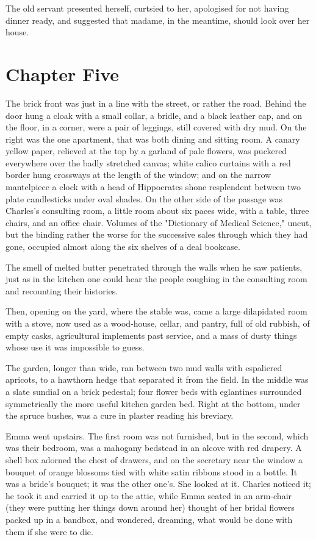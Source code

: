 \documentclass{tufte-book}
\begin{document}
The old servant presented herself, curtsied to her, apologised for not
having dinner ready, and suggested that madame, in the meantime, should
look over her house.



\chapter{Chapter Five}

The brick front was just in a line with the street, or rather the road.
Behind the door hung a cloak with a small collar, a bridle, and a black
leather cap, and on the floor, in a corner, were a pair of leggings,
still covered with dry mud. On the right was the one apartment, that was
both dining and sitting room. A canary yellow paper, relieved at the
top by a garland of pale flowers, was puckered everywhere over the badly
stretched canvas; white calico curtains with a red border hung crossways
at the length of the window; and on the narrow mantelpiece a clock with
a head of Hippocrates shone resplendent between two plate candlesticks
under oval shades. On the other side of the passage was Charles's
consulting room, a little room about six paces wide, with a table,
three chairs, and an office chair. Volumes of the "Dictionary of Medical
Science," uncut, but the binding rather the worse for the successive
sales through which they had gone, occupied almost along the six shelves
of a deal bookcase.

The smell of melted butter penetrated through the walls when he saw
patients, just as in the kitchen one could hear the people coughing in
the consulting room and recounting their histories.

Then, opening on the yard, where the stable was, came a large
dilapidated room with a stove, now used as a wood-house, cellar, and
pantry, full of old rubbish, of empty casks, agricultural implements
past service, and a mass of dusty things whose use it was impossible to
guess.

The garden, longer than wide, ran between two mud walls with espaliered
apricots, to a hawthorn hedge that separated it from the field. In the
middle was a slate sundial on a brick pedestal; four flower beds with
eglantines surrounded symmetrically the more useful kitchen garden bed.
Right at the bottom, under the spruce bushes, was a cure in plaster
reading his breviary.

Emma went upstairs. The first room was not furnished, but in the second,
which was their bedroom, was a mahogany bedstead in an alcove with red
drapery. A shell box adorned the chest of drawers, and on the secretary
near the window a bouquet of orange blossoms tied with white satin
ribbons stood in a bottle. It was a bride's bouquet; it was the other
one's. She looked at it. Charles noticed it; he took it and carried it
up to the attic, while Emma seated in an arm-chair (they were putting
her things down around her) thought of her bridal flowers packed up in
a bandbox, and wondered, dreaming, what would be done with them if she
were to die.
\end{document}
